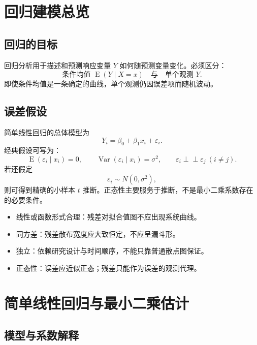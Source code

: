 \documentclass[11pt,a4paper]{article}
\newcommand{\E}{\operatorname{E}}
\newcommand{\Var}{\operatorname{Var}}
\newcommand{\ind}{\perp\!\!\!\perp}
\newcommand{\1}{\mathbf{1}}
\begin{document}
\section{回归建模总览}

\subsection{回归的目标}

回归分析用于描述和预测响应变量 $Y$ 如何随预测变量变化。必须区分：
\[
  \text{条件均值 } \E(Y\mid X=x)
  \quad\text{与}\quad
  \text{单个观测 }Y.
\]
即使条件均值是一条确定的曲线，单个观测仍因误差项而随机波动。

\subsection{误差假设}

简单线性回归的总体模型为
\[
  Y_i=\beta_0+\beta_1x_i+\varepsilon_i.
\]
经典假设可写为：
\[
  \E(\varepsilon_i\mid x_i)=0,
  \qquad
  \Var(\varepsilon_i\mid x_i)=\sigma^2,
  \qquad
  \varepsilon_i\ind\varepsilon_j\ (i\ne j).
\]
若还假定
\[
  \varepsilon_i\sim N(0,\sigma^2),
\]
则可得到精确的小样本 $t$ 推断。正态性主要服务于推断，不是最小二乘系数存在的必要条件。

\begin{conceptbox}[模型假设与残差图]
\begin{itemize}
  \item 线性或函数形式合理：残差对拟合值图不应出现系统曲线。
  \item 同方差：残差散布宽度应大致恒定，不应呈漏斗形。
  \item 独立：依赖研究设计与时间顺序，不能只靠普通散点图保证。
  \item 正态性：误差应近似正态；残差只能作为误差的观测代理。
\end{itemize}
\end{conceptbox}

\section{简单线性回归与最小二乘估计}

\subsection{模型与系数解释}
\end{document}
